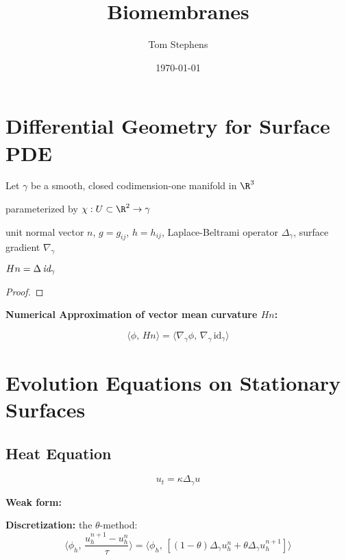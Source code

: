 \documentclass[10pt]{article}
\title{Biomembranes}
\author{Tom Stephens}
\date{ \today}
\begin{document}
\maketitle



\section{Differential Geometry for Surface PDE}

Let $\gamma$ be a smooth, closed codimension-one manifold in $\R^3$ 

parameterized by $\chi : U \subset \R^2 \to \gamma$

unit normal vector $n$, $g = g_{ij}$, $h = h_{ij}$, Laplace-Beltrami operator $\Delta_{\gamma}$,
surface gradient $\nabla_{\gamma}$

\begin{theorem}{ $Hn = \Delta\, \emph{id}_\gamma$ }
   \label{thm:vector_mean_curvature}
\end{theorem}

\begin{proof}
\end{proof}

{\bf Numerical Approximation of vector mean curvature $Hn$:}

\[\langle \phi, \, H n \rangle = \langle \nabla_\gamma \phi, \, \nabla_\gamma\,
\text{id}_\gamma \rangle \]


\section{Evolution Equations on Stationary Surfaces}


\subsection{Heat Equation}

\begin{equation}
   u_t = \kappa \Delta_{\gamma} u
   \label{eqn:heat}
\end{equation}

{\bf Weak form:} 

{\bf Discretization:} the $\theta$-method: 
\begin{equation}
   \langle \phi_h, \, \frac{u_h^{n+1} - u_h^n}{\tau} \rangle = \langle \phi_h,
   \, \left[ (1 - \theta)\Delta_\gamma u_h^{n} + \theta
   \Delta_{\gamma} u_h^{n+1}\right]\rangle
   \label{disc:heat_theta}
\end{equation}
\end{document}
